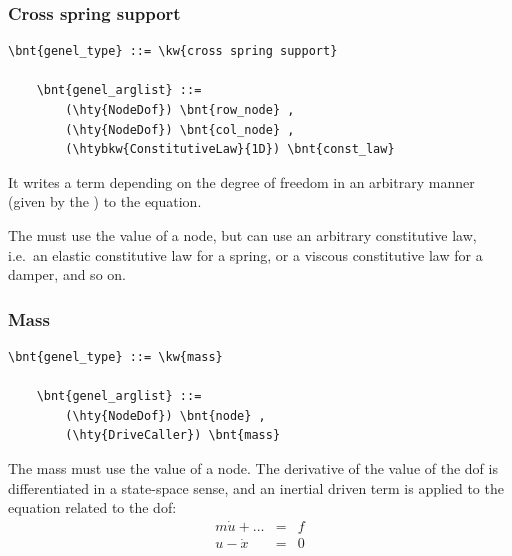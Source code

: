 \subsubsection{Cross spring support}
\label{sec:EL:GENEL:CROSS-SPRING-SUPPORT}
\begin{Verbatim}[commandchars=\\\{\}]
    \bnt{genel_type} ::= \kw{cross spring support}

    \bnt{genel_arglist} ::=
        (\hty{NodeDof}) \bnt{row_node} ,
        (\hty{NodeDof}) \bnt{col_node} ,
        (\htybkw{ConstitutiveLaw}{1D}) \bnt{const_law}
\end{Verbatim}
It writes a term depending on the  degree of freedom in an
arbitrary manner (given by the ) to the 
 equation.

The  must use the  value
of a  node, but can use an arbitrary constitutive law,
i.e.\ an elastic constitutive law for a spring, or a viscous
constitutive law for a damper, and so on.

\subsubsection{Mass}
\label{sec:EL:GENEL:MASS}
\begin{Verbatim}[commandchars=\\\{\}]
    \bnt{genel_type} ::= \kw{mass}

    \bnt{genel_arglist} ::=
        (\hty{NodeDof}) \bnt{node} ,
        (\hty{DriveCaller}) \bnt{mass}
\end{Verbatim}
The mass must use the  value of a  node.
The derivative of the  value of
the dof is differentiated in a state-space sense, and an inertial driven
term is applied to the equation related to the dof:
\begin{eqnarray*}
        m\dot{u} + \ldots & = & f \\
	u - \dot{x} & = & 0
\end{eqnarray*}

